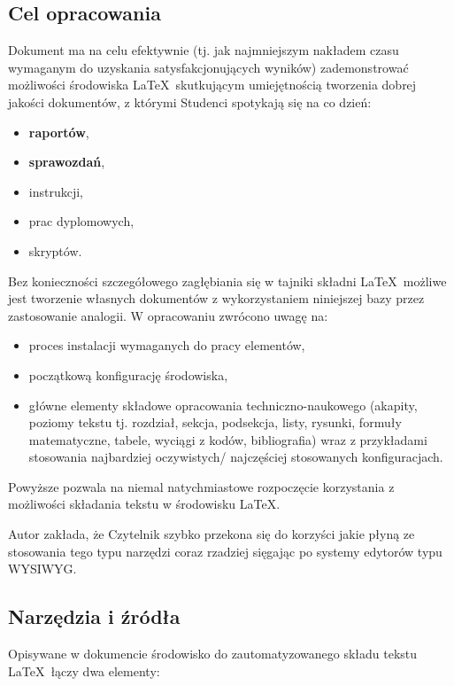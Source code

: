 \subsection{Cel opracowania}

Dokument ma na celu efektywnie (tj. jak najmniejszym nakładem czasu wymaganym do uzyskania satysfakcjonujących wyników) zademonstrować możliwości środowiska \LaTeX\ skutkującym umiejętnością tworzenia dobrej jakości dokumentów, z którymi Studenci spotykają się na co dzień:

\begin{itemize}
	\item \textbf{raportów},
	\item \textbf{sprawozdań},
	\item instrukcji,
	\item prac dyplomowych,
	\item skryptów. 
\end{itemize}

Bez konieczności szczegółowego zagłębiania się w tajniki składni \LaTeX\ możliwe jest tworzenie własnych dokumentów z wykorzystaniem niniejszej bazy przez zastosowanie analogii. W opracowaniu zwrócono uwagę na:

\begin{itemize}
	\item proces instalacji wymaganych do pracy elementów,
	\item początkową konfigurację środowiska,
	\item główne elementy składowe opracowania techniczno-naukowego (akapity, poziomy tekstu tj. rozdział, sekcja, podsekcja, listy, rysunki, formuły matematyczne, tabele, wyciągi z kodów, bibliografia) wraz z przykładami stosowania najbardziej oczywistych/ najczęściej stosowanych konfiguracjach.
\end{itemize}

Powyższe pozwala na niemal natychmiastowe rozpoczęcie korzystania z możliwości składania tekstu w środowisku \LaTeX. 

Autor zakłada, że Czytelnik szybko przekona się do korzyści jakie płyną ze stosowania tego typu narzędzi coraz rzadziej sięgając po systemy edytorów typu WYSIWYG.

\subsection{Narzędzia i źródła}

Opisywane w dokumencie środowisko do zautomatyzowanego składu tekstu \LaTeX\ łączy dwa elementy:

